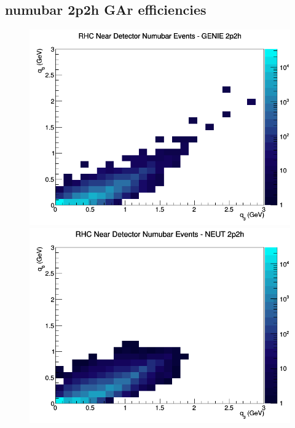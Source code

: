 \subsection{numubar 2p2h GAr efficiencies}
\begin{figure}[h]
\includegraphics[width=\linewidth]{eff_q0_q3/GAr/2p2h_RHC_ND_numubar_q3_q0_GENIE.png}
\endminipage
{}
\includegraphics[width=\linewidth]{eff_q0_q3/GAr/2p2h_RHC_ND_numubar_q3_q0_NEUT.png}
\endminipage
{}

\end{figure}
